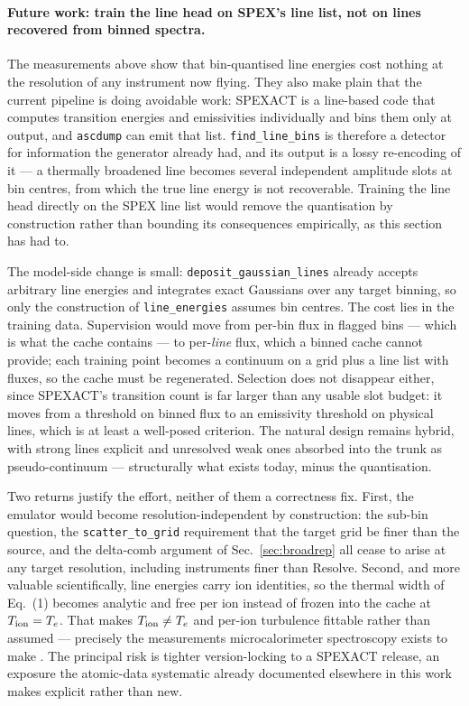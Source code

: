 \documentclass[11pt,a4paper]{article}
\newcommand{\code}[1]{\texttt{#1}}
\begin{document}
\paragraph{Future work: train the line head on SPEX's line list, not on
lines recovered from binned spectra.}
\label{par:linelist}
The measurements above show that bin-quantised line energies cost
nothing at the resolution of any instrument now flying. They also make
plain that the current pipeline is doing avoidable work: SPEXACT is a
line-based code that computes transition energies and emissivities
individually and bins them only at output, and \code{ascdump} can emit
that list. \code{find\_line\_bins} is therefore a detector for
information the generator already had, and its output is a
lossy re-encoding of it --- a thermally broadened line becomes several
independent amplitude slots at bin centres, from which the true line
energy is not recoverable. Training the line head directly on the SPEX
line list would remove the quantisation by construction rather than
bounding its consequences empirically, as this section has had to.

The model-side change is small: \code{deposit\_gaussian\_lines} already
accepts arbitrary line energies and integrates exact Gaussians over any
target binning, so only the construction of \code{line\_energies}
assumes bin centres. The cost lies in the training data. Supervision
would move from per-bin flux in flagged bins --- which is what the
cache contains --- to per-\emph{line} flux, which a binned cache cannot
provide; each training point becomes a continuum on a grid plus a line
list with fluxes, so the cache must be regenerated. Selection does not
disappear either, since SPEXACT's transition count is far larger than
any usable slot budget: it moves from a threshold on binned flux to an
emissivity threshold on physical lines, which is at least a
well-posed criterion. The natural design remains hybrid, with strong
lines explicit and unresolved weak ones absorbed into the trunk as
pseudo-continuum --- structurally what exists today, minus the
quantisation.

Two returns justify the effort, neither of them a correctness fix.
First, the emulator would become resolution-independent by
construction: the sub-bin question, the \code{scatter\_to\_grid}
requirement that the target grid be finer than the source, and the
delta-comb argument of Sec.~\ref{sec:broadrep} all cease to arise at
any target resolution, including instruments finer than Resolve.
Second, and more valuable scientifically, line energies carry ion
identities, so the thermal width of Eq.~(1) becomes analytic and free
per ion instead of frozen into the cache at $T_{\rm ion}=T_e$. That
makes $T_{\rm ion}\neq T_e$ and per-ion turbulence fittable rather than
assumed --- precisely the measurements microcalorimeter spectroscopy
exists to make \citep{hitomi16,hitomi18}. The principal risk is tighter
version-locking to a SPEXACT release, an exposure the atomic-data
systematic already documented elsewhere in this work makes explicit
rather than new.
\end{document}

